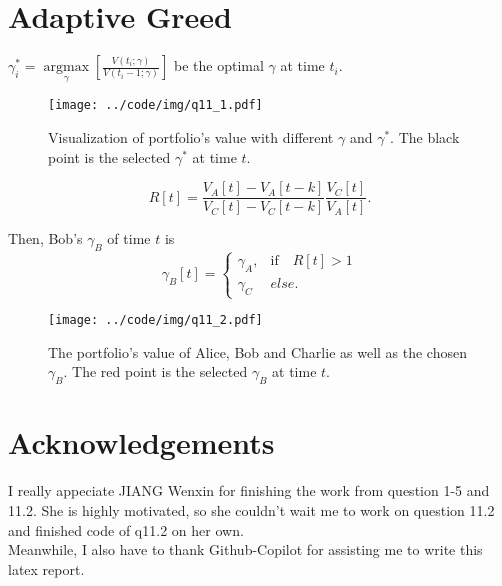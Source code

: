 \documentclass[runningheads]{llncs}
\begin{document}
\section{Adaptive Greed}\label{sec:11}
$\gamma_i^*=\underset{\gamma}{\operatorname{argmax}}\left[\frac{V\left(t_i ; \gamma\right)}{V\left(t_i-1 ; \gamma\right)}\right]$ be the optimal $\gamma$ at time $t_i$. 



\begin{figure}[!htbp]
    \begin{center}
        \texttt{[image: ../code/img/q11\_1.pdf]}
    \end{center}
    \caption{Visualization of portfolio's value with different $\gamma$ and $\gamma^*$. The black point is the selected $\gamma^*$ at time $t$.}
    \label{fig:q11-1}
\end{figure}


\begin{equation}
    R[t]=\frac{V_A[t]-V_A[t-k]}{V_C[t]-V_C[t-k]}\frac{V_C[t]}{V_A[t]}.
\end{equation}

Then, Bob's $\gamma_B$ of time $t$ is
\begin{equation}
    \gamma_B[t] =
    \left\{\begin{array}{ll}
        \gamma_A, & \text{if}\quad R[t]>1 \\
        \gamma_C & else.
    \end{array}\right.
\end{equation}



\begin{figure}[!htbp]
    \begin{center}
        \texttt{[image: ../code/img/q11\_2.pdf]}
    \end{center}
    \caption{The portfolio's value of Alice, Bob and Charlie as well as the chosen $\gamma_B$. The red point is the selected $\gamma_B$ at time $t$.}
    \label{fig:q11-2}
\end{figure}

\newpage



\section*{Acknowledgements} I really appeciate JIANG Wenxin for finishing the work from question 1-5 and 11.2. 
She is highly motivated, so she couldn't wait me to work on question 11.2 and finished code of q11.2 on her own. \\
Meanwhile, I also have to thank Github-Copilot for assisting me to write this latex report.
% 
\end{document}
